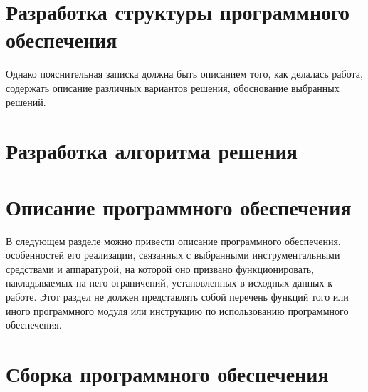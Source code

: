 \section{Разработка структуры программного обеспечения}
Однако пояснительная записка должна быть описанием того, как делалась работа, содержать описание различных вариантов решения, обоснование выбранных решений.

\section{Разработка алгоритма решения}

\section{Описание программного обеспечения}

В следующем разделе можно привести описание программного обеспечения, особенностей его
реализации, связанных с выбранными инструментальными средствами и аппаратурой, на которой
оно призвано функционировать, накладываемых на него ограничений, установленных в исходных
данных к работе. Этот раздел не должен представлять собой перечень функций того или иного
программного модуля или инструкцию по использованию программного обеспечения.

\section{Сборка программного обеспечения}